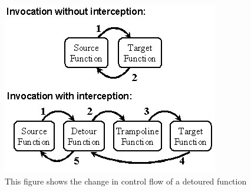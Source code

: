 \begin{figure}[h]
	\centering
	\includegraphics[scale=0.7]{sections/background/attacks/fig_detours.png}
	\caption{This figure shows the change in control flow of a detoured function \cite{detours}}
	\label{fig:detours}
\end{figure}

